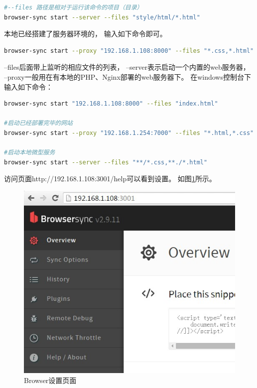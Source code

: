 \documentclass{book}
\begin{document}
\begin{lstlisting}[language=bash]
#--files 路径是相对于运行该命令的项目（目录）
browser-sync start --server --files "style/html/*.html"
\end{lstlisting}

本地已经搭建了服务器环境的，
输入如下命令即可。

\begin{lstlisting}[language=bash]
browser-sync start --proxy "192.168.1.108:8000" --files "*.css,*.html"
\end{lstlisting}

--files后面带上监听的相应文件的列表，
--server表示启动一个内置的web服务器，
--proxy一般用在有本地的PHP、Nginx部署的web服务器下。
在windows控制台下输入如下命令：

\begin{lstlisting}[language=bash]
browser-sync start "192.168.1.108:8000" --files "index.html"

#启动已经部署完毕的网站
browser-sync start --proxy "192.168.1.254:7000" --files "*.html,*.css"

#启动本地微型服务
browser-sync start --server --files "**/*.css,**./*.html"
\end{lstlisting}

访问页面http://192.168.1.108:3001/help可以看到设置。
如图\ref{fig:BrowserOverviewSetting}所示。

\begin{figure}[htbp]
	\centering
	\includegraphics[scale=0.6]{BrowserOverviewSetting.jpg}
	\caption{Browser设置页面}
	\label{fig:BrowserOverviewSetting}
\end{figure}
\end{document}
